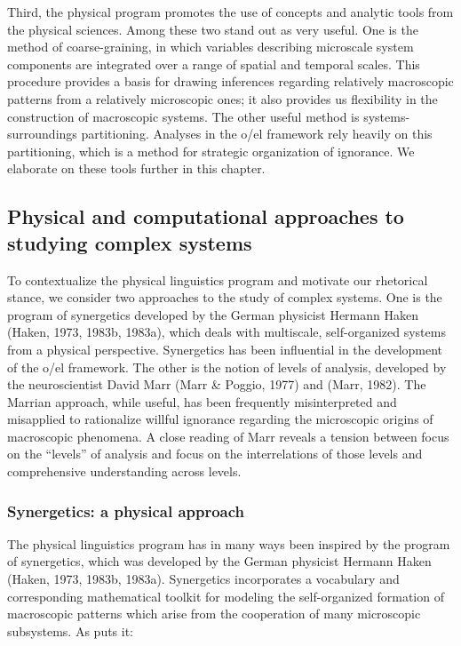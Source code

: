   Third, the physical program promotes the use of concepts and analytic tools from the physical sciences. Among these two stand out as very useful. One is the method of coarse-graining, in which variables describing microscale system components are integrated over a range of spatial and temporal scales. This procedure provides a basis for drawing inferences regarding relatively macroscopic patterns from a relatively microscopic ones; it also provides us flexibility in the construction of macroscopic systems. The other useful method is systems-surroundings partitioning. Analyses in the o/el framework rely heavily on this partitioning, which is a method for strategic organization of ignorance. We elaborate on these tools further in this chapter.

\subsection{Physical and computational approaches to studying complex systems}

To contextualize the physical linguistics program and motivate our rhetorical stance, we consider two approaches to the study of complex systems. One is the program of synergetics developed by the German physicist Hermann Haken (Haken, 1973, 1983b, 1983a), which deals with multiscale, self-organized systems from a physical perspective. Synergetics has been influential in the development of the o/el framework. The other is the notion of levels of analysis, developed by the neuroscientist David Marr (Marr \& Poggio, 1977) and (Marr, 1982). The Marrian approach, while useful, has been frequently misinterpreted and misapplied to rationalize willful ignorance regarding the microscopic origins of macroscopic phenomena. A close reading of Marr reveals a tension between focus on the “levels” of analysis and focus on the interrelations of those levels and comprehensive understanding across levels.

\subsubsection{Synergetics: a physical approach}

The physical linguistics program has in many ways been inspired by the program of synergetics, which was developed by the German physicist Hermann Haken (Haken, 1973, 1983b, 1983a). Synergetics incorporates a vocabulary and corresponding mathematical toolkit for modeling the self-organized formation of macroscopic patterns which arise from the cooperation of many microscopic subsystems. As \citet{Haken1973} puts it:

